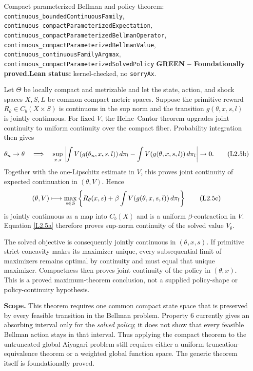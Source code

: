 \documentclass[11pt]{article}
\newcommand{\leanname}[1]{\nolinkurl{#1}}
\newcommand{\eqL}[1]{\refstepcounter{equation}\tag{L#1}}
\newcommand{\formalcheck}{\textbf{Lean status:} kernel-checked, no \texttt{sorryAx}.}
\newcommand{\greenstatus}{\textcolor{proved}{\textbf{GREEN -- Foundationally proved.}}}
\begin{document}
\begin{greenbox}{Compact parameterized Bellman and policy theorem:
\leanname{continuous_boundedContinuousFamily},
\leanname{continuous_compactParameterizedExpectation},
\leanname{continuous_compactParameterizedBellmanOperator},
\leanname{continuous_compactParameterizedBellmanValue},
\leanname{continuous_continuousFamilyArgmax},
\leanname{continuous_compactParameterizedSolvedPolicy}}
\greenstatus\quad\formalcheck

Let $\Theta$ be locally compact and metrizable and let the state, action, and
shock spaces $X,S,L$ be common compact metric spaces.  Suppose the primitive
reward $R_\theta\in C_b(X\times S)$ is continuous in the sup norm and the
transition $g(\theta,x,s,l)$ is jointly continuous.  For fixed $V$, the
Heine--Cantor theorem upgrades joint continuity to uniform continuity over
the compact fiber.  Probability integration then gives
\begin{equation}
 \theta_n\to\theta
 \quad\Longrightarrow\quad
 \sup_{x,s}\left|\int V(g(\theta_n,x,s,l))\,d\pi_l
 -\int V(g(\theta,x,s,l))\,d\pi_l\right|\to0. \eqL{2.5b}\label{L2.5b}
\end{equation}
Together with the one-Lipschitz estimate in $V$, this proves joint continuity
of expected continuation in $(\theta,V)$.  Hence
\begin{equation}
 (\theta,V)\longmapsto
 \max_{s\in S}\left\{R_\theta(x,s)+
 \beta\int V(g(\theta,x,s,l))\,d\pi_l\right\} \eqL{2.5c}\label{L2.5c}
\end{equation}
is jointly continuous as a map into $C_b(X)$ and is a uniform
$\beta$-contraction in $V$.  Equation \eqref{L2.5a} therefore proves sup-norm
continuity of the solved value $V_\theta$.

The solved objective is consequently jointly continuous in $(\theta,x,s)$.
If primitive strict concavity makes its maximizer unique, every subsequential
limit of maximizers remains optimal by continuity and must equal that unique
maximizer.  Compactness then proves joint continuity of the policy in
$(\theta,x)$.  This is a proved maximum-theorem conclusion, not a supplied
policy-shape or policy-continuity hypothesis.

\textbf{Scope.}  This theorem requires one common compact state space that is
preserved by every feasible transition in the Bellman problem.  Property 6
currently gives an absorbing interval only for the \emph{solved policy}; it
does not show that every feasible Bellman action stays in that interval.
Thus applying the compact theorem to the untruncated global Aiyagari problem
still requires either a uniform truncation-equivalence theorem or a weighted
global function space.  The generic theorem itself is foundationally proved.
\end{greenbox}
\end{document}
